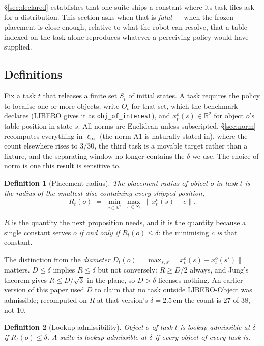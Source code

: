 \documentclass[10pt,twocolumn]{article}
\newtheorem{definition}{Definition}
\begin{document}
\S\ref{sec:declared} establishes that one suite ships a constant where its task
files ask for a distribution. This section asks when that is \emph{fatal} ---
when the frozen placement is close enough, relative to what the robot can
resolve, that a table indexed on the task alone reproduces whatever a
perceiving policy would have supplied.

\subsection{Definitions}

Fix a task $t$ that releases a finite set $S_t$ of initial states. A task requires
the policy to localise one or more objects; write $O_t$ for that set, which the
benchmark declares (LIBERO gives it as \texttt{obj\_of\_interest}), and
$x_t^o(s) \in \mathbb{R}^2$ for object $o$'s table position in state $s$. All
norms are Euclidean unless subscripted. \S\ref{sec:norm} recomputes everything
in $\ell_\infty$ (the norm A1 is naturally stated in), where the count
elsewhere rises to $3/30$, the third task is a movable target rather than a
fixture, and the separating window no longer contains the $\delta$ we use. The
choice of norm is one this result is sensitive to.

\begin{definition}[Placement radius]
\label{def:D}
The \emph{placement radius} of object $o$ in task $t$ is the radius of the
smallest disc containing every shipped position,
\[
  R_t(o) \;=\; \min_{c \in \mathbb{R}^2}\; \max_{s \in S_t}\;
  \lVert x_t^o(s) - c \rVert .
\]
\end{definition}

\noindent $R$ is the quantity the next proposition needs, and it is the
quantity because a single constant serves $o$ \emph{if and only if}
$R_t(o) \le \delta$: the minimising $c$ \emph{is} that constant.

The distinction from the \emph{diameter}
$D_t(o) = \max_{s,s'} \lVert x^o_t(s) - x^o_t(s')\rVert$ matters.
$D \le \delta$ implies $R \le \delta$ but not conversely: $R \ge D/2$ always,
and Jung's theorem gives $R \le D/\sqrt{3}$ in the plane, so $D > \delta$
licenses nothing. An earlier version of this paper used $D$ to claim that no
task outside LIBERO-Object was admissible; recomputed on $R$ at that version's
$\delta = 2.5$\,cm the count is $27$ of $38$, not $10$.

\begin{definition}[Lookup-admissibility]
\label{def:H}
Object $o$ of task $t$ is \emph{lookup-admissible at $\delta$} if
$R_t(o) \le \delta$. A suite is \emph{lookup-admissible} at $\delta$ if every
object of every task is.
\end{definition}
\end{document}
